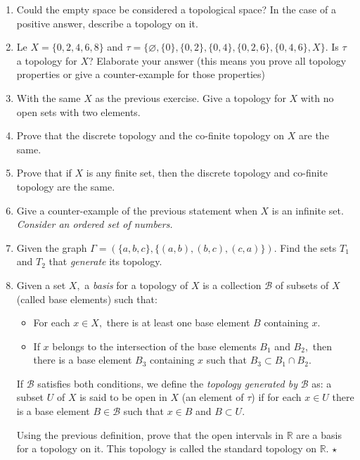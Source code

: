 \documentclass[
	fontsize=10pt, %
	twoside=false, %
	secnumdepth=1, %
]{kaobook}
\begin{document}
\begin{enumerate}

\item Could the empty space be considered a topological space? In the case of a positive answer, describe a topology on it. 

\item Le $X=\{0,2,4,6,8\}$ and $\tau=\{\varnothing, \{0\},\{0,2\},\{0,4\},\{0,2,6\},\{0,4,6\},X\}.$ Is $\tau$ a topology for $X$? Elaborate your answer (this means you prove all topology properties or give a counter-example for those properties)

\item With the same $X$ as the previous exercise. Give a topology for $X$ with no open sets with two elements.

\item Prove that the discrete topology and the co-finite topology on $X$ are the same. 

\item Prove that if $X$ is any finite set, then the discrete topology and co-finite topology are the same. 

\item Give a counter-example of the previous statement when $X$ is an infinite set. \emph{Consider an ordered set of numbers.}

\item Given the graph $\Gamma=\left(\{a,b,c\},\{(a,b),(b,c),(c,a)\}\right).$ Find the sets $T_1$ and $T_2$ that \emph{generate} its topology.

\item Given a set $X,$ a \emph{basis} for a topology of $X$ is a collection $\mathcal{B}$ of subsets of $X$ (called base elements) such that:
\begin{itemize}
\item For each $x\in X,$ there is at least one base element $B$ containing $x.$
\item If $x$ belongs to the intersection of the base elements $B_1$ and $B_2,$ then there is a base element $B_3$ containing $x$ such that $B_3\subset B_1\cap B_2.$ 
\end{itemize}
If $\mathcal{B}$ satisfies both conditions, we define the \emph{topology generated by} $\mathcal{B}$ as: a subset $U$ of $X$ is said to be open in $X$ (an element of $\tau$) if for each $x\in U$ there is a base element $B\in\mathcal{B}$ such that $x\in B$ and $B\subset U.$

Using the previous definition, prove that the open intervals in $\mathbb{R}$ are a basis for a topology on it. This topology is called the standard topology on $\mathbb{R}.$ $\star$
\end{enumerate}
\end{document}
